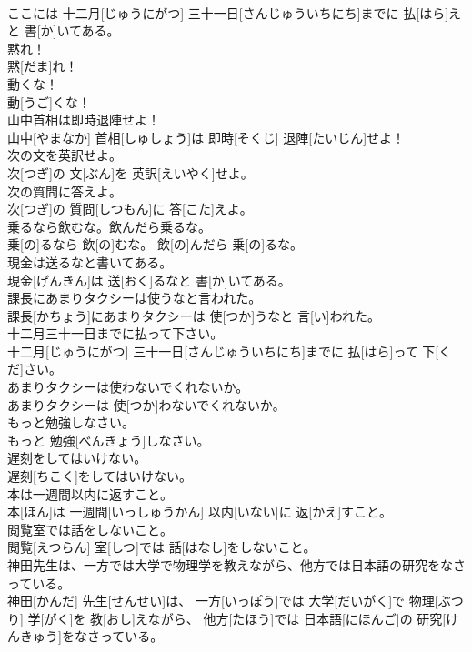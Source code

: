 \documentclass[8pt]{extreport}
\begin{document}
\begin{CJK}{UTF8}{min}
\\	ここには 十二月[じゅうにがつ] 三十一日[さんじゅういちにち]までに 払[はら]えと 書[か]いてある。
\\	黙れ！	
\\	黙[だま]れ！
\\	動くな！	
\\	動[うご]くな！
\\	山中首相は即時退陣せよ！	
\\	山中[やまなか] 首相[しゅしょう]は 即時[そくじ] 退陣[たいじん]せよ！
\\	次の文を英訳せよ。
\\	次[つぎ]の 文[ぶん]を 英訳[えいやく]せよ。 
\\	次の質問に答えよ。
\\	次[つぎ]の 質問[しつもん]に 答[こた]えよ。 
\\	乗るなら飲むな。飲んだら乗るな。	
\\	乗[の]るなら 飲[の]むな。 飲[の]んだら 乗[の]るな。
\\	現金は送るなと書いてある。	
\\	現金[げんきん]は 送[おく]るなと 書[か]いてある。
\\	課長にあまりタクシーは使うなと言われた。	
\\	課長[かちょう]にあまりタクシーは 使[つか]うなと 言[い]われた。
\\	十二月三十一日までに払って下さい。	
\\	十二月[じゅうにがつ] 三十一日[さんじゅういちにち]までに 払[はら]って 下[くだ]さい。
\\	あまりタクシーは使わないでくれないか。	
\\	あまりタクシーは 使[つか]わないでくれないか。
\\	もっと勉強しなさい。	
\\	もっと 勉強[べんきょう]しなさい。
\\	遅刻をしてはいけない。	
\\	遅刻[ちこく]をしてはいけない。
\\	本は一週間以内に返すこと。	
\\	本[ほん]は 一週間[いっしゅうかん] 以内[いない]に 返[かえ]すこと。
\\	閲覧室では話をしないこと。	
\\	閲覧[えつらん] 室[しつ]では 話[はなし]をしないこと。
\\	神田先生は、一方では大学で物理学を教えながら、他方では日本語の研究をなさっている。	
\\	神田[かんだ] 先生[せんせい]は、 一方[いっぽう]では 大学[だいがく]で 物理[ぶつり] 学[がく]を 教[おし]えながら、 他方[たほう]では 日本語[にほんご]の 研究[けんきゅう]をなさっている。

\end{CJK}
\end{document}
